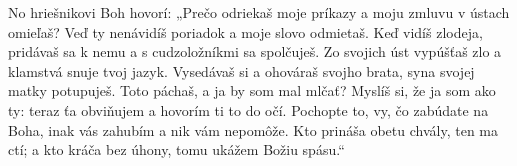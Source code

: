No hriešnikovi Boh hovorí:
„Prečo odriekaš moje príkazy
a moju zmluvu v ústach omieľaš?
\versseparator
Veď ty nenávidíš poriadok
a moje slovo odmietaš.
\versseparator
Keď vidíš zlodeja, pridávaš sa k nemu
a s cudzoložníkmi sa spolčuješ.
\versseparator
Zo svojich úst vypúšťaš zlo
a klamstvá snuje tvoj jazyk.
\versseparator
Vysedávaš si a ohováraš svojho brata,
syna svojej matky potupuješ.
Toto páchaš, a ja by som mal mlčať?
\versseparator
Myslíš si, že ja som ako ty:
teraz ťa obviňujem a hovorím ti to do očí.
\versseparator
Pochopte to, vy, čo zabúdate na Boha,
inak vás zahubím a nik vám nepomôže.
\versseparator
Kto prináša obetu chvály, ten ma ctí;
a kto kráča bez úhony, tomu ukážem Božiu spásu.“